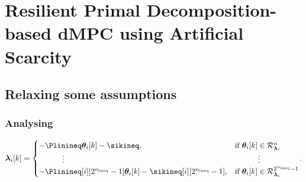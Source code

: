 \documentclass[aspectratio=169]{beamer}
\begin{document}
\section{Resilient Primal Decomposition-based dMPC using Artificial Scarcity}
\subsection{Relaxing some assumptions}
\begin{frame}
  \frametitle{Analysing}
  \begin{equation}
  \label{eq:lambdafuntheta}
  \begin{aligned}
    \lambdaik=
    \begin{cases}
      -\Plinineq\thetaik-\sikineq,&\text{if}\ \thetaik \in\set{R}_{\lambdai}^{n}\\
      \qquad\quad \vdots&\qquad\quad \vdots\\
      -\Plinineq[i][2^{\nineq}-1]\thetaik-\sikineq[i][2^{\nineq}-1],&\text{if}\ \thetaik \in\set{R}_{\lambdai}^{2^{\nineq}-1}\\
    \end{cases}
  \end{aligned}.
\end{equation}
\end{frame}
\end{document}
